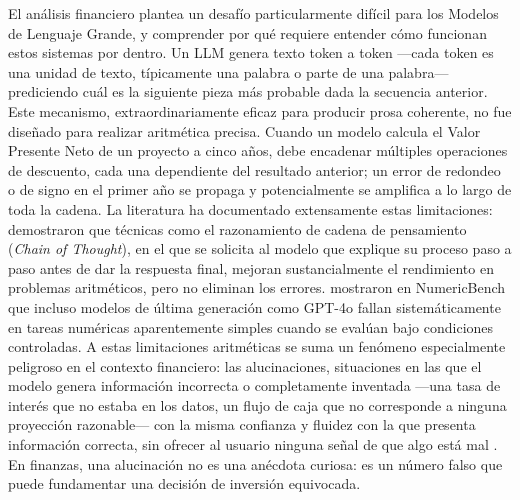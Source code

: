 \documentclass[12pt,a4paper]{article}
\begin{document}
El análisis financiero plantea un desafío particularmente difícil para los Modelos de Lenguaje Grande, y comprender por qué requiere entender cómo funcionan estos sistemas por dentro. Un LLM genera texto token a token ---cada token es una unidad de texto, típicamente una palabra o parte de una palabra--- prediciendo cuál es la siguiente pieza más probable dada la secuencia anterior. Este mecanismo, extraordinariamente eficaz para producir prosa coherente, no fue diseñado para realizar aritmética precisa. Cuando un modelo calcula el Valor Presente Neto de un proyecto a cinco años, debe encadenar múltiples operaciones de descuento, cada una dependiente del resultado anterior; un error de redondeo o de signo en el primer año se propaga y potencialmente se amplifica a lo largo de toda la cadena. La literatura ha documentado extensamente estas limitaciones: \citet{Wei2022} demostraron que técnicas como el razonamiento de cadena de pensamiento (\textit{Chain of Thought}), en el que se solicita al modelo que explique su proceso paso a paso antes de dar la respuesta final, mejoran sustancialmente el rendimiento en problemas aritméticos, pero no eliminan los errores. \citet{Li2024} mostraron en NumericBench que incluso modelos de última generación como GPT-4o fallan sistemáticamente en tareas numéricas aparentemente simples cuando se evalúan bajo condiciones controladas. A estas limitaciones aritméticas se suma un fenómeno especialmente peligroso en el contexto financiero: las alucinaciones, situaciones en las que el modelo genera información incorrecta o completamente inventada ---una tasa de interés que no estaba en los datos, un flujo de caja que no corresponde a ninguna proyección razonable--- con la misma confianza y fluidez con la que presenta información correcta, sin ofrecer al usuario ninguna señal de que algo está mal \citep{Huang2024}. En finanzas, una alucinación no es una anécdota curiosa: es un número falso que puede fundamentar una decisión de inversión equivocada.
\end{document}
